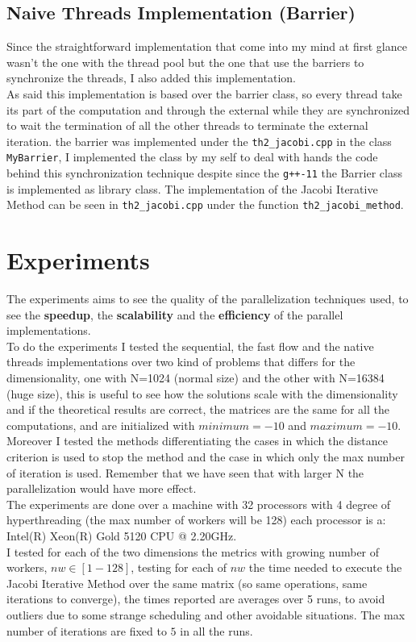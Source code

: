 \documentclass[12pt]{extarticle}
\begin{document}
\subsection{Naive Threads Implementation (Barrier)}
Since the straightforward implementation that come into my mind at first glance wasn't the one with the thread pool but the one that use the barriers to synchronize the threads, I also added this implementation.\\
As said this implementation is based over the barrier class, so every thread take its part of the computation and through the external while they are synchronized to wait the termination of all the other threads to terminate the external iteration. the barrier was implemented under the \texttt{th2\_jacobi.cpp} in the class \texttt{MyBarrier}, I implemented the class by my self to deal with hands the code behind this synchronization technique despite since the \texttt{g++-11} the Barrier class is implemented as library class.
The implementation of the Jacobi Iterative Method can be seen in \texttt{th2\_jacobi.cpp} under the function \texttt{th2\_jacobi\_method}.

\section{Experiments}
The experiments aims to see the quality of the parallelization techniques used, to see the \textbf{speedup}, the \textbf{scalability} and the \textbf{efficiency} of the parallel implementations.\\
To do the experiments I tested the sequential, the fast flow and the native threads implementations over two kind of problems that differs for the dimensionality, one with N=1024 (normal size) and the other with N=16384 (huge size), this is useful to see how the solutions scale with the dimensionality and if the theoretical results are correct, the matrices are the same for all the computations, and are initialized with $minimum = -10$ and $maximum = -10$. Moreover I tested the methods differentiating the cases in which the distance criterion is used to stop the method and the case in which only the max number of iteration is used. Remember that we have seen that with larger N the parallelization would have more effect.\\
The experiments are done over a machine with 32 processors with 4 degree of hyperthreading (the max number of workers will be 128) each processor is a: Intel(R) Xeon(R) Gold 5120 CPU @ 2.20GHz.\\
I tested for each of the two dimensions the metrics with growing number of workers, $nw \in [1-128]$, testing for each of $nw$ the time needed to execute the Jacobi Iterative Method over the same matrix (so same operations, same iterations to converge), the times reported are averages over 5 runs, to avoid outliers due to some strange scheduling and other avoidable situations. The max number of iterations are fixed to $5$ in all the runs.
\end{document}
